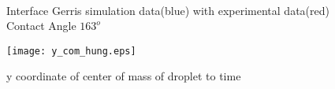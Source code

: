  \begin{figure}[H]
 \centering
       \\
    \caption{Interface Gerris simulation data(blue) with \cite{Wang2007} experimental data(red) Contact Angle $163^o$ }
 \label{Fig:gs7}
 \end{figure}   
\begin{figure}
 \centering
 \texttt{[image: y\_com\_hung.eps]}
 \caption{y coordinate of center of mass of droplet to time}
 \label{Fig:y_com}
\end{figure}

